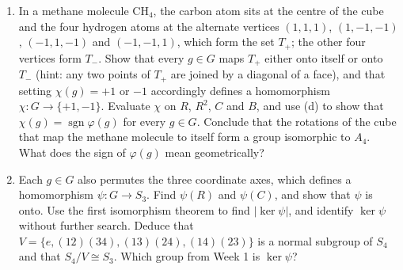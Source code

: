\documentclass[11pt,a4paper]{article}
\DeclareMathOperator{\sgn}{sgn}
\begin{document}
\begin{enumerate}
  \item In a methane molecule CH$_4$, the carbon atom sits at the centre of the cube and the four hydrogen atoms at the alternate vertices $(1, 1, 1)$, $(1, -1, -1)$, $(-1, 1, -1)$ and $(-1, -1, 1)$, which form the set $T_+$; the other four vertices form $T_-$. Show that every $g \in G$ maps $T_+$ either onto itself or onto $T_-$ (hint: any two points of $T_+$ are joined by a diagonal of a face), and that setting $\chi(g) = +1$ or $-1$ accordingly defines a homomorphism $\chi\colon G \to \{+1, -1\}$. Evaluate $\chi$ on $R$, $R^2$, $C$ and $B$, and use (d) to show that $\chi(g) = \sgn\varphi(g)$ for every $g \in G$. Conclude that the rotations of the cube that map the methane molecule to itself form a group isomorphic to $A_4$. What does the sign of $\varphi(g)$ mean geometrically?
  \item Each $g \in G$ also permutes the three coordinate axes, which defines a homomorphism $\psi\colon G \to S_3$. Find $\psi(R)$ and $\psi(C)$, and show that $\psi$ is onto. Use the first isomorphism theorem to find $|\ker\psi|$, and identify $\ker\psi$ without further search. Deduce that $V = \{e, (12)(34), (13)(24), (14)(23)\}$ is a normal subgroup of $S_4$ and that $S_4/V \cong S_3$. Which group from Week 1 is $\ker\psi$?
\end{enumerate}
\end{document}
